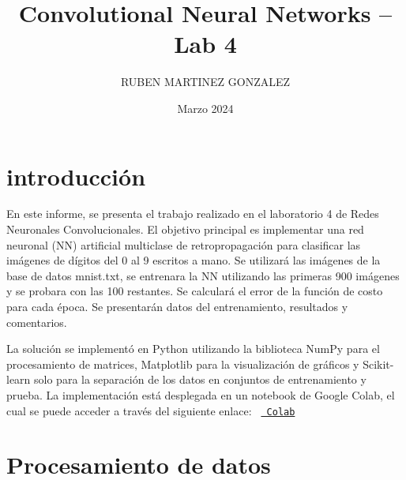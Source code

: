\documentclass{article}
\title{Convolutional Neural Networks – Lab 4}
\author{RUBEN MARTINEZ GONZALEZ}
\date{Marzo 2024}
\begin{document}
    \maketitle


    \section{introducción}\label{sec:introduccion}
    En este informe, se presenta el trabajo realizado en el laboratorio 4 de Redes Neuronales Convolucionales.
    El objetivo principal es implementar una red neuronal (NN) artificial multiclase de retropropagación para clasificar las imágenes de dígitos del 0 al 9 escritos a mano.
    \newline
    Se utilizará las imágenes de la base de datos mnist.txt, se entrenara la NN utilizando las primeras 900 imágenes y se probara con las 100 restantes.
    Se calculará el error de la función de costo para cada época.
    Se presentarán datos del entrenamiento, resultados y comentarios.

    \noindent
    La solución se implementó en Python utilizando la biblioteca NumPy para el procesamiento de matrices,
    Matplotlib para la visualización de gráficos y Scikit-learn solo para la separación de los datos en conjuntos de entrenamiento y prueba.
    \newline
    La implementación está desplegada en un notebook de Google Colab, el cual se puede acceder a través del siguiente enlace:
    \texttt{%
        \href{https://drive.google.com/file/d/1G7FsF-o0YyQpEuUWFcWKjgZJbzFlSa0B/view?usp=sharing}{%
            Colab}%
    }


    \section{Procesamiento de datos}\label{sec:Procesamiento-de-datos}
\end{document}
